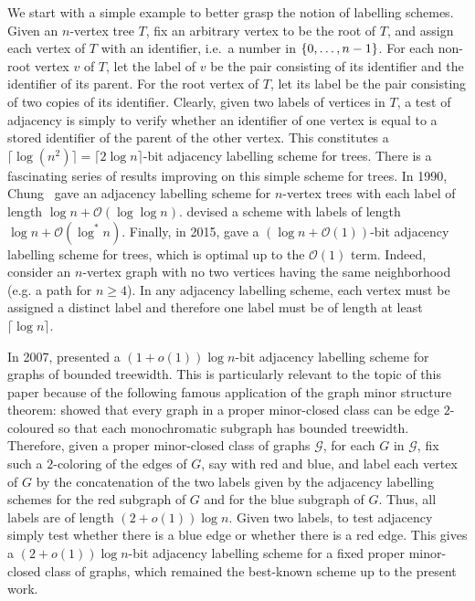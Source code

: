\documentclass{patmorin}
\renewcommand{\geq}{\geqslant}
\newcommand{\vida}[1]{\noindent{\color{pink} VD: #1}}
\newcommand{\pat}[1]{\noindent\textcolor{Magenta}{PaMo: #1}}
\newcommand{\calG}{\mathcal{G}}
\newcommand{\Oh}{\mathcal{O}}
\DeclarePairedDelimiter{\set}{\{}{\}}
\begin{document}
We start with a simple example to better grasp the notion of labelling schemes.
Given an $n$-vertex tree $T$, fix an arbitrary vertex to be the root of $T$, and assign each vertex of $T$ with an identifier, i.e.\ a number in $\set{0,\ldots,n-1}$.
For each non-root vertex $v$ of $T$,
let the label of $v$ be
the pair consisting of its identifier and the identifier of its parent.
For the root vertex of $T$, let its label be
the pair consisting of two copies of its identifier.
Clearly, given two labels of vertices in $T$,
a test of adjacency is simply to verify whether an identifier of one vertex is equal to a stored identifier of the parent of the other vertex.
This constitutes a $\lceil\log(n^2)\rceil=\lceil2\log n\rceil$-bit adjacency labelling scheme for trees.
There is a fascinating series of results improving on this simple scheme for trees. In 1990, Chung~\cite{chung:universal} gave an adjacency labelling scheme for $n$-vertex trees with each label of length $\log n +\Oh(\log\log n)$.
\citet{alstrup.rauhe:improved} devised a scheme with labels of length $\log n+\Oh(\log^*n)$.
Finally, in 2015,
\citet{alstrup.dahlgaard.ea:optimal} gave a $(\log n + \Oh(1))$-bit adjacency labelling scheme for trees, which is optimal up to the $\Oh(1)$ term.
Indeed, consider an $n$-vertex graph with no two vertices having the same neighborhood (e.g. a path for $n\geq4$).
In any adjacency labelling scheme, each vertex must be assigned a distinct label and therefore one label must be of length at least $\lceil\log n\rceil$.


In 2007, \citet{gavoille.labourel:shorter} presented
a $(1+o(1))\log n$-bit adjacency labelling scheme for graphs of bounded treewidth.
This is particularly relevant to the topic of this paper because of the following famous application of the graph minor structure theorem:
\citet{devos2004} showed that every graph
in a proper minor-closed class can be edge $2$-coloured so that each monochromatic subgraph
has bounded treewidth.
Therefore, given a proper minor-closed class of graphs $\calG$,
for each $G$ in $\calG$, fix such a $2$-coloring of the edges of $G$, say with red and blue, and label each vertex of $G$ by the concatenation of the two labels given by the adjacency labelling schemes for the red subgraph of $G$ and for the blue subgraph of $G$. Thus, all labels are of length $(2+o(1))\log n$.
Given two labels, to test adjacency simply test whether there is a blue edge or whether there is a red edge.
This gives a $(2+o(1))\log n$-bit adjacency labelling scheme for a fixed proper minor-closed class of graphs, which remained the best-known scheme up to the present work.
\end{document}
